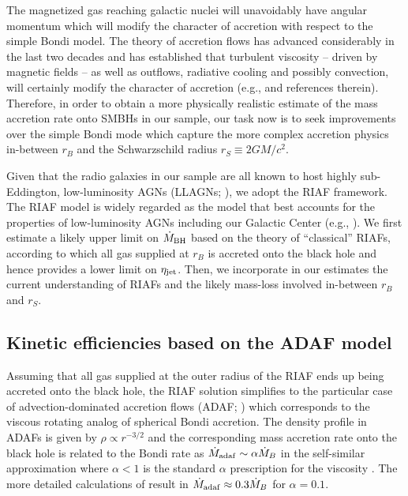 \documentclass[useAMS,usenatbib]{mn2e}
\begin{document}
The magnetized gas reaching galactic nuclei will unavoidably have angular momentum which will modify the character of accretion with respect to the simple Bondi model. The theory of accretion flows has advanced considerably in the last two decades and has  established that turbulent viscosity -- driven by magnetic fields -- as well as outflows, radiative cooling and possibly convection, will certainly modify the character of accretion (e.g., \citealt{Narayan08,McKinney12,Li13,Yuan14} and references therein). Therefore, in order to obtain a more physically realistic estimate of the mass accretion rate onto SMBHs in our sample, our task now is to seek improvements over the simple Bondi mode which capture the more complex accretion physics in-between $r_B$ and the Schwarzschild radius $r_S \equiv 2 GM/c^2$.

Given that the radio galaxies in our sample are all known to host highly sub-Eddington, low-luminosity AGNs (LLAGNs; \citealt{Merloni07,Balmaverde08,Russell13}), we adopt the RIAF framework. The RIAF model is widely regarded as the model that best accounts for the properties of low-luminosity AGNs including our Galactic Center (e.g., \citealt{Yuan03,Wu07,Wang13,Nemmen14, Yuan14}). We first estimate a likely upper limit on $\dot{M}_{\rm BH}$ based on the theory of ``classical'' RIAFs, according to which all gas supplied at $r_B$ is accreted onto the black hole and hence provides a lower limit on $\eta_{\rm jet}$. Then, we incorporate in our estimates the current understanding of RIAFs and the likely mass-loss involved in-between $r_B$ and $r_S$.


\subsection{Kinetic efficiencies based on the ADAF model}	\label{sec:adaf}

Assuming that all gas supplied at the outer radius of the RIAF ends up being accreted onto the black hole, the RIAF solution simplifies to the particular case of advection-dominated accretion flows (ADAF; \citealt{Narayan94}) which corresponds to the viscous rotating analog of spherical Bondi accretion. The density profile in ADAFs is given by $\rho \propto r^{-3/2}$ and the corresponding mass accretion rate onto the black hole is related to the Bondi rate as $\dot{M}_{\rm adaf} \sim \alpha  \dot{M}_B$ in the self-similar approximation where $\alpha<1$ is the standard $\alpha$ prescription for the viscosity \citep{Shakura73, Narayan94,Narayan02}. The more detailed calculations of \cite{Narayan11} result in $\dot{M}_{\rm adaf} \approx 0.3 \dot{M}_B$ for $\alpha=0.1$. 
\end{document}
